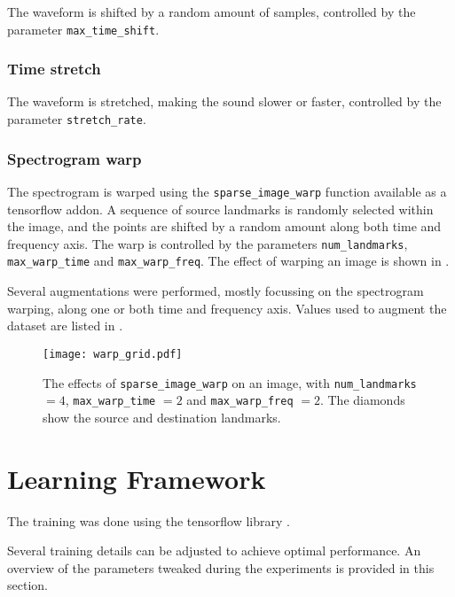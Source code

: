 The waveform is shifted by a random amount of samples, controlled by the
parameter \texttt{max\_time\_shift}.

\subsubsection{Time stretch}

The waveform is stretched, making the sound slower or faster, controlled by the
parameter \texttt{stretch\_rate}.

\subsubsection{Spectrogram warp}

The spectrogram is warped using the \texttt{sparse\_image\_warp} function
available as a tensorflow addon.
A sequence of source landmarks is randomly selected within the image, and the
points are shifted by a random amount along both time and frequency axis. The
warp is controlled by the parameters \texttt{num\_landmarks},
\texttt{max\_warp\_time} and \texttt{max\_warp\_freq}.
The effect of warping an image is shown in .

Several augmentations were performed, mostly focussing on the spectrogram
warping, along one or both time and frequency axis.
Values used to augment the dataset are listed in .

\begin{figure}[t!]
    \centering
    \texttt{[image: warp\_grid.pdf]}
    \caption{
    The effects of \texttt{sparse\_image\_warp} on an image, with
\texttt{num\_landmarks} $=4$, \texttt{max\_warp\_time} $=2$ and
\texttt{max\_warp\_freq} $=2$. The diamonds show the source and destination
landmarks.}%
    \label{fig:warp_grid}
\end{figure}

\section{Learning Framework}
\label{sec:learning_framework}


The training was done using the tensorflow library \cite{tensorflow2015-whitepaper}.


Several training details can be adjusted to achieve optimal performance.
An overview of the parameters tweaked during the experiments is provided in
this section.


